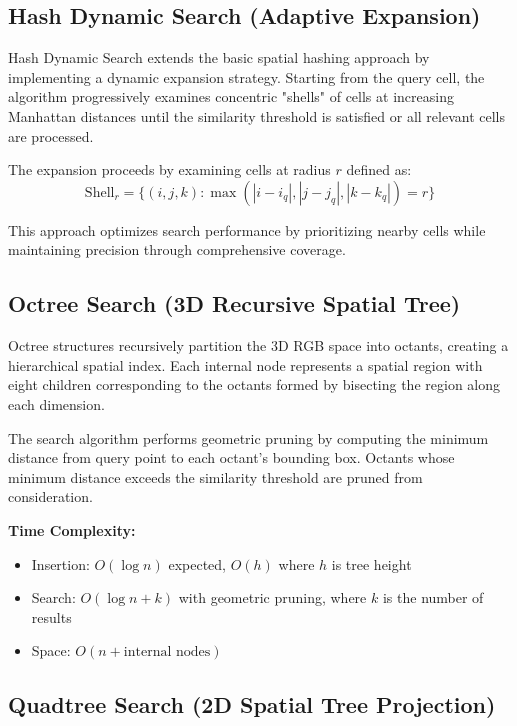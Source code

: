 \documentclass{sbc2023}
\begin{document}
\subsection{Hash Dynamic Search (Adaptive Expansion)}

Hash Dynamic Search extends the basic spatial hashing approach by implementing a dynamic expansion strategy. Starting from the query cell, the algorithm progressively examines concentric "shells" of cells at increasing Manhattan distances until the similarity threshold is satisfied or all relevant cells are processed.

The expansion proceeds by examining cells at radius $r$ defined as:
\begin{equation}
\text{Shell}_r = \{(i, j, k) : \max(|i - i_q|, |j - j_q|, |k - k_q|) = r\}
\label{eq:shell_expansion}
\end{equation}

This approach optimizes search performance by prioritizing nearby cells while maintaining precision through comprehensive coverage.

\subsection{Octree Search (3D Recursive Spatial Tree)}

Octree structures recursively partition the 3D RGB space into octants, creating a hierarchical spatial index. Each internal node represents a spatial region with eight children corresponding to the octants formed by bisecting the region along each dimension.

The search algorithm performs geometric pruning by computing the minimum distance from query point to each octant's bounding box. Octants whose minimum distance exceeds the similarity threshold are pruned from consideration.

\textbf{Time Complexity:}
\begin{itemize}
    \item Insertion: $O(\log n)$ expected, $O(h)$ where $h$ is tree height
    \item Search: $O(\log n + k)$ with geometric pruning, where $k$ is the number of results
    \item Space: $O(n + \text{internal nodes})$
\end{itemize}

\subsection{Quadtree Search (2D Spatial Tree Projection)}
\end{document}
